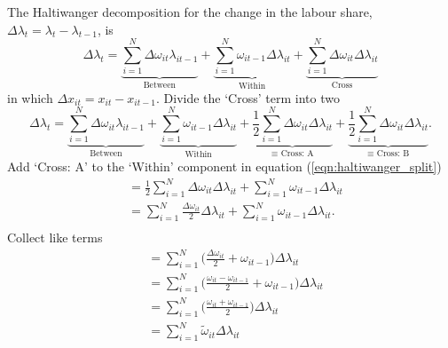 
\noindent The Haltiwanger decomposition for the change in the labour share, $\Delta \lambda_{t} = \lambda_{t} - \lambda_{t-1}$, is
\begin{equation*}
    \Delta \lambda_{t} = \underbrace{\sum_{i=1}^{N}\Delta\omega_{it}\lambda_{it-1}}_\text{Between} + \underbrace{\sum_{i=1}^{N}\omega_{it-1}\Delta\lambda_{it}}_\text{Within} + \underbrace{\sum_{i=1}^{N}\Delta\omega_{it}\Delta\lambda_{it}}_\text{Cross}
\end{equation*}
in which $\Delta x_{it} = x_{it} - x_{it-1}$. Divide the `Cross' term into two
\begin{equation}
    \Delta \lambda_{t} = \underbrace{\sum_{i=1}^{N}\Delta\omega_{it}\lambda_{it-1}}_\text{Between} + \underbrace{\sum_{i=1}^{N}\omega_{it-1}\Delta\lambda_{it}}_\text{Within} + \underbrace{\frac{1}{2}\sum_{i=1}^{N}\Delta\omega_{it}\Delta\lambda_{it}}_\text{$\equiv$ Cross: A} + \underbrace{\frac{1}{2}\sum_{i=1}^{N}\Delta\omega_{it}\Delta\lambda_{it}}_\text{$\equiv$ Cross: B}.
\label{eqn:haltiwanger_split}
\end{equation}
Add `Cross: A' to the `Within' component in equation (\ref{eqn:haltiwanger_split})
\begin{equation*}
\begin{split}
    &= \frac{1}{2}\sum_{i=1}^{N}\Delta\omega_{it}\Delta\lambda_{it} + \sum_{i=1}^{N}\omega_{it-1}\Delta\lambda_{it} \\
    &= \sum_{i=1}^{N}\frac{\Delta\omega_{it}}{2}\Delta\lambda_{it} + \sum_{i=1}^{N}\omega_{it-1}\Delta\lambda_{it}. \\
\end{split}
\end{equation*}
Collect like terms
\begin{equation}
\begin{split}
    &= \sum_{i=1}^{N}\bigg(\frac{\Delta\omega_{it}}{2} + \omega_{it-1}\bigg)\Delta\lambda_{it} \\
    &= \sum_{i=1}^{N}\bigg(\frac{\omega_{it} - \omega_{it-1}}{2} + \omega_{it-1}\bigg)\Delta\lambda_{it} \\
    &= \sum_{i=1}^{N}\bigg(\frac{\omega_{it} + \omega_{it-1}}{2}\bigg)\Delta\lambda_{it} \\
    &= \sum_{i=1}^{N}\tilde{\omega}_{it}\Delta\lambda_{it} \\
\end{split}
\label{eqn:Shift_derivation}
\end{equation}
